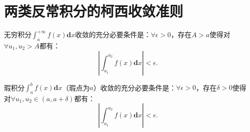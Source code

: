 \section{两类反常积分的柯西收敛准则}

\begin{theorem}[无穷积分的Cauchy收敛准则]
	无穷积分$\int_{a}^{+\infty}f(x)\textbf{d}x$收敛的充分必要条件是：$\forall\epsilon>0$，存在$A>a$使得对$\forall u_1,u_2>A$都有：
	\begin{equation}
		\left|\int_{u_1}^{u_2}f(x)\textbf{d}x\right|<\epsilon.
	\end{equation}
\end{theorem}

\begin{theorem}[瑕积分的Cauchy收敛准则]
	瑕积分$\int_{a}^{b} f(x)\textbf{d}x$（瑕点为$a$）收敛的充分必要条件是：$\forall\epsilon>0$，存在$\delta>0$使得对$\forall u_1,u_2\in (a,a+\delta)$都有：
	\begin{equation}
		\left|\int_{u_1}^{u_2}f(x)\textbf{d}x\right|<\epsilon.
	\end{equation}
\end{theorem}